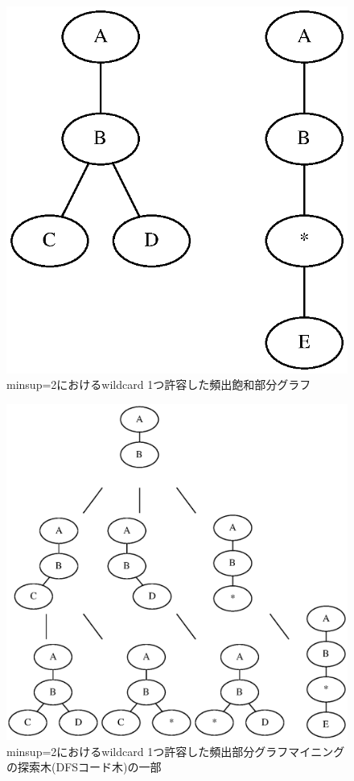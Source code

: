 \documentclass[12pt,fleqn]{jsotsuron}
\begin{document}
\begin{figure}[t]
\begin{center}
\includegraphics[scale = 0.3]{fig/wip-clo.eps}
\end{center}
\caption{minsup=2におけるwildcard 1つ許容した頻出飽和部分グラフ}
\label{fig:wipc}
\end{figure}
\begin{figure}[t]
\begin{center}
\includegraphics[scale = 0.35]{fig/tree.eps}
\end{center}
\caption{minsup=2におけるwildcard 1つ許容した頻出部分グラフマイニングの探索木(DFSコード木)の一部}
\label{fig:ned}
\end{figure}
\end{document}
